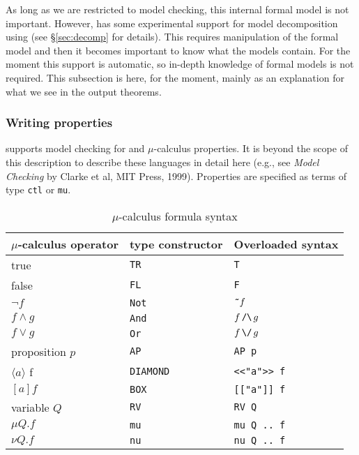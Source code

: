 As long as we are restricted to model checking, this internal formal model is not important. However, \hc{} has some experimental support for model decomposition using \HOL{} (see \S\ref{sec:decomp} for details). This requires manipulation of the formal model and then it becomes important to know what the models contain. For the moment this support is automatic, so in-depth knowledge of formal models is not required. This subsection is here, for the moment, mainly as an explanation for what we see in the \hc{} output theorems.

\subsubsection{Writing properties}\label{sec:prop}

\hc{} supports model checking for \ctl and \(\mu\)-calculus properties. It is beyond the scope of this description to describe these languages in detail here (e.g., see \emph{Model Checking} by Clarke et al, MIT Press, 1999). Properties are specified as \HOL{} terms of type \texttt{ctl} or \texttt{mu}.

\begin{table}
\caption{\HOL{} \(\mu\)-calculus formula syntax}
\label{tab_mu}
\begin{tabular}{|l|l|l|}
\hline
\(\mu\)-calculus operator & \HOL{} type constructor & Overloaded syntax \\
\hline
true & \texttt{TR} & \texttt{T} \\
false & \texttt{FL} & \texttt{F} \\
$\lnot f$ & \texttt{Not} & $\texttt{\~{}} f$  \\
$f \land g$ & \texttt{And} & $f\, \hand\, g$ \\
$f \lor g$ & \texttt{Or} & $f\, \hor\, g$ \\
proposition $p$ & \texttt{AP} & \texttt{AP p} \\
$\langle a \rangle$ f& \texttt{DIAMOND} & \verb+<<"a">> f+ \\
$[a] f$  & \texttt{BOX} & \verb+[["a"]] f+ \\
variable $Q$ & \texttt{RV} & \texttt{RV Q} \\
$\mu Q . f$ & \texttt{mu} & \texttt{mu Q .. f} \\
$\nu Q . f$ & \texttt{nu} & \texttt{nu Q .. f} \\
\hline
\end{tabular}
\end{table}

